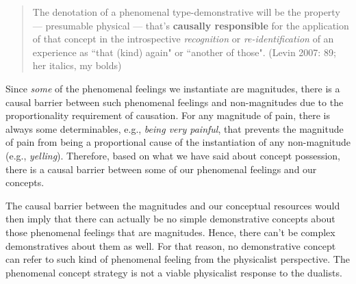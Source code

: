 \documentclass[a4paper,12pt]{article}
\begin{document}
\begin{quote}
The denotation of a phenomenal type-demonstrative will be the property --- presumable physical --- that's \textbf{causally responsible} for the application of that concept in the introspective \emph{recognition} or \emph{re-identification} of an experience as ``that (kind) again" or ``another of those". (Levin 2007: 89; her italics, my bolds)
\end{quote}

Since \emph{some} of the phenomenal feelings we instantiate are magnitudes, there is a causal barrier between such phenomenal feelings and non-magnitudes due to the proportionality requirement of causation. For any magnitude of pain, there is always some determinables, e.g., \emph{being very painful}, that prevents the magnitude of pain from being a proportional cause of the instantiation of any non-magnitude (e.g., \emph{yelling}). Therefore, based on what we have said about concept possession, there is a causal barrier between some of our phenomenal feelings and our concepts.

The causal barrier between the magnitudes and our conceptual resources would then imply that there can actually be no simple demonstrative concepts about those phenomenal feelings that are magnitudes. Hence, there can't be complex demonstratives about them as well. For that reason, no demonstrative concept can refer to such kind of phenomenal feeling from the physicalist perspective. The phenomenal concept strategy is not a viable physicalist response to the dualists.\footnotemark

\end{document}
